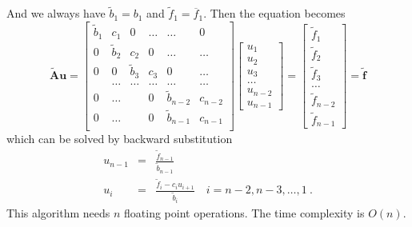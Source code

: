 \documentclass{article}
\begin{document}
	And we always have $\tilde{b}_1=b_1$ and $\tilde{f}_1=\overline{f}_1$. 
	Then the equation becomes 
	\begin{equation}
	\tilde{\mathbf{A}}\mathbf{u} = \begin{bmatrix}
	\tilde{b}_1& c_1& 0 &\dots   & \dots &0 \\
	0 & \tilde{b}_2 & c_2 &0 &\dots &\dots \\
	0&0 &\tilde{b}_3 & c_3 & 0 & \dots \\
	& \dots   & \dots &\dots   &\dots & \dots \\
	0&\dots   &  &0 &\tilde{b}_{n-2}& c_{n-2} \\
	0&\dots    &  & 0  &\tilde{b}_{n-1} & c_{n-1} \\
	\end{bmatrix}
	\begin{bmatrix}
	u_1 \\
	u_2 \\
	u_3 \\
	\dots \\
	u_{n-2} \\
	u_{n-1}
	\end{bmatrix}
	=
	\begin{bmatrix}
	\tilde{f}_1 \\
	\tilde{f}_2 \\
	\tilde{f}_3 \\
	\dots \\
	\tilde{f}_{n-2} \\
	\tilde{f}_{n-1}
	\end{bmatrix}
	=\tilde{\mathbf{f}}
	\end{equation}
	which can be solved by backward substitution 
	\begin{eqnarray}\label{backward}
	\nonumber
	u_{n-1}&=&\frac{\tilde{f}_{n-1}}{\tilde{b}_{n-1}} \\
	u_{i}&=&\frac{\tilde{f}_i-c_i u_{i+1}}{\tilde{b}_i}\quad i=n-2,n-3,\dots,1\ .
	\end{eqnarray}
	This algorithm needs $n$ floating point operations. 
	The time complexity is $O(n)$. 
	
\end{document}

